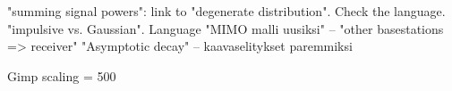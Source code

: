 "summing signal powers": link to "degenerate distribution". Check the language.
"impulsive vs. Gaussian". Language
"MIMO malli uusiksi" – "other basestations => receiver"
"Asymptotic decay" – kaavaselitykset paremmiksi

Gimp scaling = 500 
